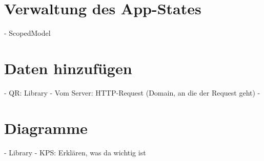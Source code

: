 	\section{Verwaltung des App-States}
	\label{sec:verwaltungAppState}
	
	- ScopedModel
	
	\section{Daten hinzufügen}
	\label{}
	
	- QR: Library
	- Vom Server: HTTP-Request (Domain, an die der Request geht)
	- 
	
	
	\section{Diagramme}
	\label{}
	
	- Library
	- KPS: Erklären, was da wichtig ist
	
	\section{}
	\label{}
	
	\section{}
	\label{}
	
	\section{}
	\label{}
	
	\section{}
	\label{}
	
	\section{}
	\label{}